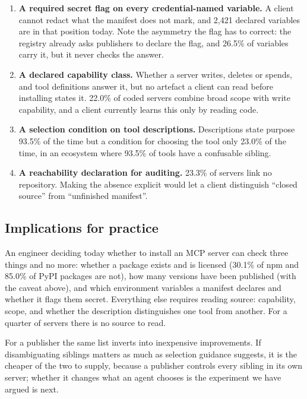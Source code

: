 \documentclass[a4paper,fleqn]{cas-dc}
\begin{document}
\begin{enumerate}
\item \textbf{A required secret flag on every credential-named variable.} A
client cannot redact what the manifest does not mark, and 2,421 declared
variables are in that position today. Note the asymmetry the flag has to
correct: the registry already asks publishers to declare the flag, and
26.5\% of variables carry it, but it never checks the answer.
\item \textbf{A declared capability class.} Whether a server writes, deletes or
spends, and tool definitions answer it, but no artefact a client can read
before installing states it. 22.0\% of coded servers combine broad scope with
write capability, and a client currently learns this only by reading code.
\item \textbf{A selection condition on tool descriptions.} Descriptions state
purpose 93.5\% of the time but a condition for choosing the tool only 23.0\%
of the time, in an ecosystem where 93.5\% of tools have a
confusable sibling.
\item \textbf{A reachability declaration for auditing.} 23.3\% of servers link
no repository. Making the absence explicit would let a client distinguish
``closed source'' from ``unfinished manifest''.
\end{enumerate}

\subsection{Implications for practice}

An engineer deciding today whether to install an MCP server can check three
things and no more: whether a package exists and is licensed (30.1\% of npm and
85.0\% of PyPI packages are not), how many versions have been published (with
the caveat above), and which environment variables a manifest declares and
whether it flags them secret. Everything else requires reading source: capability,
scope, and whether the description distinguishes one tool from another. For a
quarter of servers there is no source to read.

For a publisher the same list inverts into inexpensive improvements. If
disambiguating siblings matters as much as selection guidance suggests, it is
the cheaper of the two to supply, because a publisher controls every sibling in
its own server; whether it changes what an agent chooses is the experiment we
have argued is next.

\end{document}
